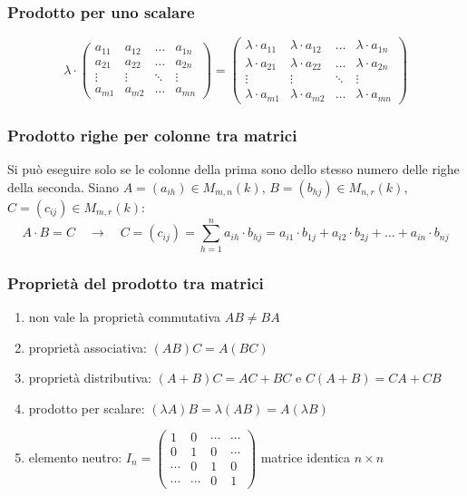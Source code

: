 \documentclass[a4paper]{article}
\begin{document}
\subsubsection*{Prodotto per uno scalare}
\[\lambda \cdot \begin{pmatrix}
	a_{11} & a_{12} & \dots & a_{1n} \\
	a_{21} & a_{22} & \dots & a_{2n} \\
	\vdots & \vdots & \ddots & \vdots \\
	a_{m1} & a_{m2} & \dots & a_{mn}
\end{pmatrix} = 
\begin{pmatrix}
	\lambda \cdot a_{11} & \lambda \cdot a_{12} & \dots & \lambda \cdot a_{1n} \\
	\lambda \cdot a_{21} & \lambda \cdot a_{22} & \dots & \lambda \cdot a_{2n} \\
	\vdots & \vdots & \ddots & \vdots \\
	\lambda \cdot a_{m1} & \lambda \cdot a_{m2} & \dots & \lambda \cdot a_{mn}
\end{pmatrix}\]

\subsubsection*{Prodotto righe per colonne tra matrici}
Si può eseguire solo se le colonne della prima sono dello stesso numero delle righe della seconda.
Siano \(A = (a_{ih}) \in M_{m,n}(k)\), \(B = (b_{hj}) \in M_{n,r}(k)\), \(C = (c_{ij}) \in M_{m,r}(k)\):
\[A \cdot B = C \quad \longrightarrow \quad C = (c_{ij}) = \sum_{h=1}^{n} a_{ih} \cdot b_{hj} = a_{i1} \cdot b_{1j} + a_{i2} \cdot b_{2j} + \dots + a_{in} \cdot b_{nj}\]

\subsubsection*{Proprietà del prodotto tra matrici}
\begin{enumerate}
	\item non vale la proprietà commutativa \(AB \neq BA\)
	\item proprietà associativa: \((AB)C = A(BC)\)
	\item proprietà distributiva: \((A+B)C = AC + BC\) e \(C(A+B) = CA + CB\)
	\item prodotto per scalare: \((\lambda A)B = \lambda (AB) = A (\lambda B)\)
	\item elemento neutro: \(I_n = \left( \begin{smallmatrix}
		1 & 0 & \cdots & \cdots \\
		0 & 1 & 0 & \cdots \\
		\cdots & 0 & 1 & 0 \\
		\cdots & \cdots & 0 & 1
	\end{smallmatrix} \right)\) matrice identica \(n \times n\)
\end{enumerate}
\end{document}
